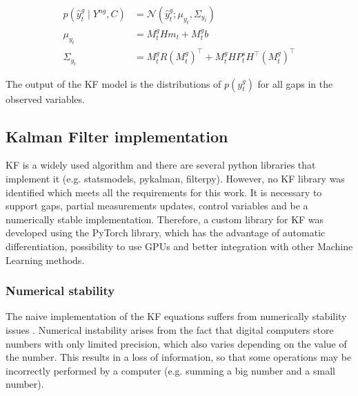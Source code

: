 \documentclass{article}
\newcommand{\norm}[3]{\mathcal{N}\left(#1; #2, #3\right)} %
\let\Oldsubsection\subsection
\renewcommand{\subsection}{\FloatBarrier\Oldsubsection}
\begin{document}
\begin{equation}
\begin{aligned}\label{eq:filter_predictions}
    p(\hat{y}^g_t \mid Y^{ng}, C) &= \norm{\hat{y}^g_t}{\mu_{y_t}}{\Sigma_{y_t}} \\
    \mu_{y_t} &= M^g_tHm_t + M^g_tb \\
    \Sigma_{y_t} &= M^g_tR(M^g_t)^\top + M^g_tHP^s_tH^\top (M^g_t)^\top
\end{aligned}
\end{equation}

The output of the KF model is the distributions of $p(y^g_t)$ for all gaps in the observed variables. 

\subsection{Kalman Filter implementation}


KF is a widely used algorithm and there are several python libraries that implement it (e.g. \textsf{statsmodels}, \textsf{pykalman}, \textsf{filterpy}). However, no  KF library was identified which meets all the requirements for this work. It is necessary to support gaps, partial measurements updates, control variables and be a numerically stable implementation.
Therefore, a custom library for KF was developed using the \textsf{PyTorch} library, which has the advantage of automatic differentiation, possibility to use GPUs and better integration with other Machine Learning methods.

\subsubsection{Numerical stability}

The naive implementation of the KF equations suffers from numerically stability issues \cite{mohinder_s_grewal_kalman_2001, dan_simon_optimal_2006}. %
Numerical instability arises from the fact that digital computers store numbers with only limited precision, which also varies depending on the value of the number. This results in a loss of information, so that some operations may be incorrectly performed by a  computer (e.g. summing a big number and a small number).
\end{document}
